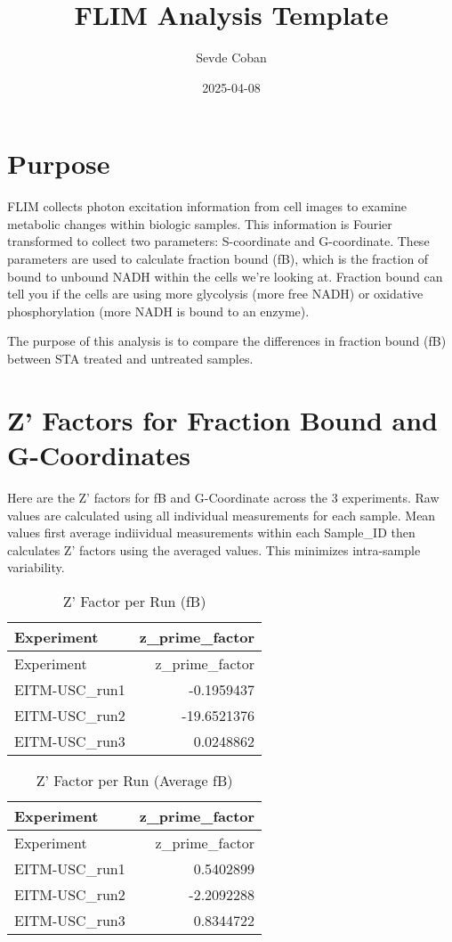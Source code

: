 \documentclass[
]{article}
\title{FLIM Analysis Template}
\author{Sevde Coban}
\date{2025-04-08}
\begin{document}
\maketitle

\section{Purpose}\label{purpose}

FLIM collects photon excitation information from cell images to examine
metabolic changes within biologic samples. This information is Fourier
transformed to collect two parameters: S-coordinate and G-coordinate.
These parameters are used to calculate fraction bound (fB), which is the
fraction of bound to unbound NADH within the cells we're looking at.
Fraction bound can tell you if the cells are using more glycolysis (more
free NADH) or oxidative phosphorylation (more NADH is bound to an
enzyme).

The purpose of this analysis is to compare the differences in fraction
bound (fB) between STA treated and untreated samples.

\section{Z' Factors for Fraction Bound and
G-Coordinates}\label{z-factors-for-fraction-bound-and-g-coordinates}

Here are the Z' factors for fB and G-Coordinate across the 3
experiments. Raw values are calculated using all individual measurements
for each sample. Mean values first average indiividual measurements
within each Sample\_ID then calculates Z' factors using the averaged
values. This minimizes intra-sample variability.

\begin{longtable}[]{@{}lr@{}}
\caption{Z' Factor per Run (fB)}\tabularnewline
\toprule\noalign{}
Experiment & z\_prime\_factor \\
\midrule\noalign{}
\endfirsthead
\toprule\noalign{}
Experiment & z\_prime\_factor \\
\midrule\noalign{}
\endhead
\bottomrule\noalign{}
\endlastfoot
EITM-USC\_run1 & -0.1959437 \\
EITM-USC\_run2 & -19.6521376 \\
EITM-USC\_run3 & 0.0248862 \\
\end{longtable}

\begin{longtable}[]{@{}lr@{}}
\caption{Z' Factor per Run (Average fB)}\tabularnewline
\toprule\noalign{}
Experiment & z\_prime\_factor \\
\midrule\noalign{}
\endfirsthead
\toprule\noalign{}
Experiment & z\_prime\_factor \\
\midrule\noalign{}
\endhead
\bottomrule\noalign{}
\endlastfoot
EITM-USC\_run1 & 0.5402899 \\
EITM-USC\_run2 & -2.2092288 \\
EITM-USC\_run3 & 0.8344722 \\
\end{longtable}
\end{document}
